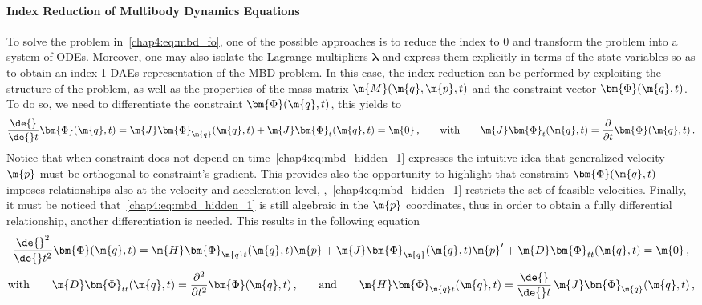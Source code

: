 \paragraph{Index Reduction of Multibody Dynamics Equations}

To solve the problem in~\eqref{chap4:eq:mbd_fo}, one of the possible approaches is to reduce the index to 0 and transform the problem into a system of \acp{ODE}. Moreover, one may also isolate the Lagrange multipliers $\bm{\lambda}$ and express them explicitly in terms of the state variables so as to obtain an index-1 \acp{DAE} representation of the \ac{MBD} problem. In this case, the index reduction can be performed by exploiting the structure of the problem, as well as the properties of the mass matrix $\m{M}(\m{q}, \m{p}, t)$ and the constraint vector $\bm{\Phi}(\m{q}, t)$. To do so, we need to differentiate the constraint $\bm{\Phi}(\m{q}, t)$, this yields to
%
\begin{equation}
  \dfrac{\de{}}{\de{} t}\bm{\Phi}(\m{q}, t) = \m{J}\bm{\Phi}_{\m{q}}(\m{q}, t) + \m{J}\bm{\Phi}_{t}(\m{q}, t) = \m{0}
  \, \text{,}
  \qquad \text{with} \qquad \m{J}\bm{\Phi}_{t}(\m{q}, t) = \dfrac{\partial}{\partial t}\bm{\Phi}(\m{q}, t)
  \, \text{.}
  \label{chap4:eq:mbd_hidden_1}
\end{equation}
%
Notice that when constraint does not depend on time~\eqref{chap4:eq:mbd_hidden_1} expresses the intuitive idea that generalized velocity $\m{p}$ must be orthogonal to constraint's gradient. This provides also the opportunity to highlight that constraint $\bm{\Phi}(\m{q}, t)$ imposes relationships also at the velocity and acceleration level, \ie{},~\eqref{chap4:eq:mbd_hidden_1} restricts the set of feasible velocities. Finally, it must be noticed that~\eqref{chap4:eq:mbd_hidden_1} is still algebraic in the $\m{p}$ coordinates, thus in order to obtain a fully differential relationship, another differentiation is needed. This results in the following equation
%
\begin{equation}
  \dfrac{\de{}^2}{\de{}t^2}\bm{\Phi}(\m{q}, t) = \m{H}\bm{\Phi}_{\m{q}t}(\m{q}, t)\m{p} + \m{J}\bm{\Phi}_{\m{q}}(\m{q}, t)\m{p}^{\prime} + \m{D}\bm{\Phi}_{tt}(\m{q}, t) = \m{0} \, \text{,}
  \label{chap4:eq:mbd_hidden_2}
\end{equation}
\begin{equation*}
  \text{with} \qquad
  \m{D}\bm{\Phi}_{tt}(\m{q}, t) = \dfrac{\partial^2}{\partial t^2}\bm{\Phi}(\m{q}, t) \, \text{,}
  \qquad \text{and} \qquad
  \m{H}\bm{\Phi}_{\m{q}t}(\m{q}, t) = \dfrac{\de{}}{\de{} t}\,\m{J}\bm{\Phi}_{\m{q}}(\m{q}, t) \, \text{,}
\end{equation*}

